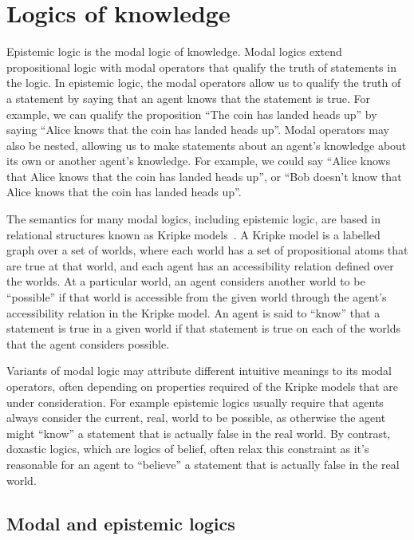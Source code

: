 \section{Logics of knowledge}

Epistemic logic is the modal logic of knowledge.
Modal logics extend propositional logic with modal operators that qualify the truth of statements in the logic.
In epistemic logic, the modal operators allow us to qualify the truth of a statement by saying that an agent knows that the statement is true.
For example, we can qualify the proposition ``The coin has landed heads up'' by saying ``Alice knows that the coin has landed heads up''.
Modal operators may also be nested, allowing us to make statements about an agent's knowledge about its own or another agent's knowledge.
For example, we could say ``Alice knows that Alice knows that the coin has landed heads up'', or ``Bob doesn't know that Alice knows that the coin has landed heads up''.

The semantics for many modal logics, including epistemic logic, are based in relational structures known as Kripke models~\cite{kripke:1963,blackburn:2001}.
A Kripke model is a labelled graph over a set of worlds, where each world has a set of propositional atoms that are true at that world, and each agent has an accessibility relation defined over the worlds.
At a particular world, an agent considers another world to be ``possible'' if that world is accessible from the given world through the agent's accessibility relation in the Kripke model.
An agent is said to ``know'' that a statement is true in a given world if that statement is true on each of the worlds that the agent considers possible.

Variants of modal logic may attribute different intuitive meanings to its modal operators, often depending on properties required of the Kripke models that are under consideration.
For example epistemic logics usually require that agents always consider the current, real, world to be possible, as otherwise the agent might ``know'' a statement that is actually false in the real world.
By contrast, doxastic logics, which are logics of belief, often relax this constraint as it's reasonable for an agent to ``believe'' a statement that is actually false in the real world.

\subsection{Modal and epistemic logics}

